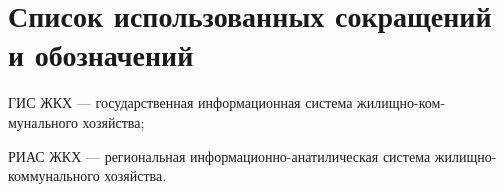 \section*{Список использованных сокращений и обозначений}

ГИС ЖКХ --- государственная информационная система жилищно-ком-\linebreak мунального хозяйства;

РИАС ЖКХ --- региональная информационно-анатилическая система жилищно-коммунального хозяйства.

\clearpage
\newpage